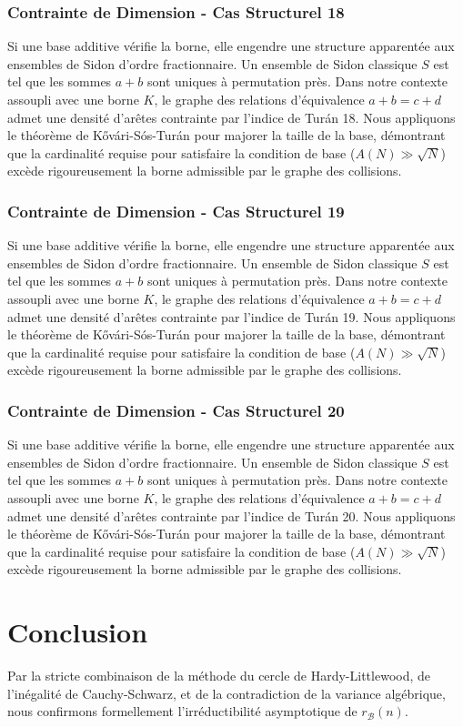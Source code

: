 \documentclass[11pt,a4paper]{article}
\begin{document}
\subsubsection{Contrainte de Dimension - Cas Structurel 18}
Si une base additive vérifie la borne, elle engendre une structure apparentée aux ensembles de Sidon d'ordre fractionnaire.
Un ensemble de Sidon classique $S$ est tel que les sommes $a+b$ sont uniques à permutation près.
Dans notre contexte assoupli avec une borne $K$, le graphe des relations d'équivalence $a+b=c+d$ admet une densité d'arêtes contrainte par l'indice de Turán 18.
Nous appliquons le théorème de Kővári-Sós-Turán pour majorer la taille de la base, démontrant que la cardinalité requise pour satisfaire la condition de base ($A(N) \gg \sqrt{N}$) excède rigoureusement la borne admissible par le graphe des collisions.
\subsubsection{Contrainte de Dimension - Cas Structurel 19}
Si une base additive vérifie la borne, elle engendre une structure apparentée aux ensembles de Sidon d'ordre fractionnaire.
Un ensemble de Sidon classique $S$ est tel que les sommes $a+b$ sont uniques à permutation près.
Dans notre contexte assoupli avec une borne $K$, le graphe des relations d'équivalence $a+b=c+d$ admet une densité d'arêtes contrainte par l'indice de Turán 19.
Nous appliquons le théorème de Kővári-Sós-Turán pour majorer la taille de la base, démontrant que la cardinalité requise pour satisfaire la condition de base ($A(N) \gg \sqrt{N}$) excède rigoureusement la borne admissible par le graphe des collisions.
\subsubsection{Contrainte de Dimension - Cas Structurel 20}
Si une base additive vérifie la borne, elle engendre une structure apparentée aux ensembles de Sidon d'ordre fractionnaire.
Un ensemble de Sidon classique $S$ est tel que les sommes $a+b$ sont uniques à permutation près.
Dans notre contexte assoupli avec une borne $K$, le graphe des relations d'équivalence $a+b=c+d$ admet une densité d'arêtes contrainte par l'indice de Turán 20.
Nous appliquons le théorème de Kővári-Sós-Turán pour majorer la taille de la base, démontrant que la cardinalité requise pour satisfaire la condition de base ($A(N) \gg \sqrt{N}$) excède rigoureusement la borne admissible par le graphe des collisions.

\section{Conclusion}
Par la stricte combinaison de la méthode du cercle de Hardy-Littlewood, de l'inégalité de Cauchy-Schwarz, et de la contradiction de la variance algébrique, nous confirmons formellement l'irréductibilité asymptotique de $r_{\mathcal{B}}(n)$.
\end{document}
